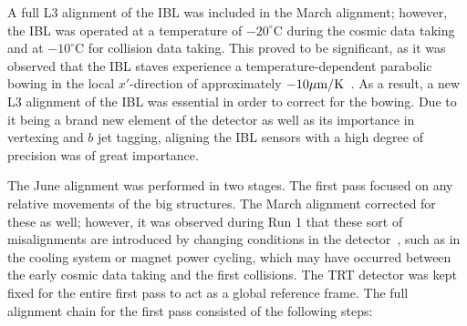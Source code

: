 A full L3 alignment of the IBL was included in the March alignment; however, the IBL was operated at a temperature of $-20^{\circ}\textrm{C}$ during the cosmic data taking and at $-10^{\circ}\textrm{C}$ for collision data taking.
This proved to be significant, as it was observed that the IBL staves experience a temperature-dependent parabolic bowing in the local $x'$-direction of approximately $-10\mu\textrm{m}/\textrm{K}$~\cite{2015.alignment-ibl-stability}.
As a result, a new L3 alignment of the IBL was essential in order to correct for the bowing.
Due to it being a brand new element of the detector as well as its importance in vertexing and $b$ jet tagging, aligning the IBL sensors with a high degree of precision was of great importance.

The June alignment was performed in two stages.
The first pass focused on any relative movements of the big structures.
The March alignment corrected for these as well; however, it was observed during Run 1 that these sort of misalignments are introduced by changing conditions in the detector~\cite{2014.alignment-performance-8tev}, such as in the cooling system or magnet power cycling, which may have occurred between the early cosmic data taking and the first  collisions.
The TRT detector was kept fixed for the entire first pass to act as a global reference frame.
The full alignment chain for the first pass consisted of the following steps:
